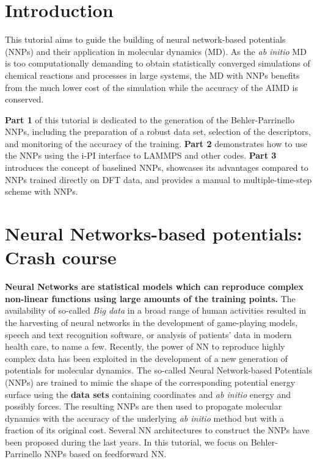 \documentclass[12pt]{article}
\begin{document}

\newpage
\tableofcontents

\newpage
\pagestyle{fancy}
\renewcommand\headrulewidth{1pt}
\renewcommand\footrulewidth{1pt}
\fancyfoot[C]{\thepage}
\fancyfoot[R]{\today}
\section{Introduction}
This tutorial aims to guide the building of neural network-based potentials (NNPs) and their application in molecular dynamics (MD). As the \textit{ab initio} MD is too computationally demanding to obtain statistically converged simulations of chemical reactions and processes in large systems, the MD with NNPs benefits from the much lower cost of the simulation while the accuracy of the AIMD is conserved. 

\textbf{Part 1} of this tutorial is dedicated to the generation of the Behler-Parrinello NNPs, including the preparation of a robust data set, selection of the descriptors, and monitoring of the accuracy of the training. \textbf{Part 2} demonstrates how to use the NNPs using the i-PI interface to LAMMPS and other codes. \textbf{Part 3} introduces the concept of baselined NNPs, showcases its advantages compared to NNPs trained directly on DFT data, and provides a manual to multiple-time-step scheme with NNPs. 

\section{Neural Networks-based potentials: Crash course}
\textbf{Neural Networks are statistical models which can reproduce complex non-linear functions using large amounts of the training points.} The availability of so-called \textit{Big data} in a broad range of human activities resulted in the harvesting of neural networks in the development of game-playing models, speech and text recognition software, or analysis of patients' data in modern health care, to name a few. Recently, the power of NN to reproduce highly complex data has been exploited in the development of a new generation of potentials for molecular dynamics. The so-called Neural Network-based Potentials (NNPs) are trained to mimic the shape of the corresponding potential energy surface using the \textbf{data sets} containing coordinates and  \textit{ab initio} energy and possibly forces. The resulting NNPs are then used to propagate molecular dynamics with the accuracy of the underlying \textit{ab initio} method but with a fraction of its original cost. Several NN architectures to construct the NNPs have been proposed during the last years. In this tutorial, we focus on Behler-Parrinello NNPs based on feedforward NN.  
\end{document}
